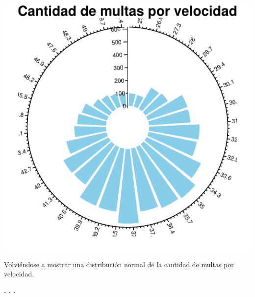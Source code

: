 \documentclass{article}\usepackage[]{graphicx}\usepackage[]{color}
\makeatletter
\def\maxwidth{ %
  \ifdim\Gin@nat@width>\linewidth
    \linewidth
  \else
    \Gin@nat@width
  \fi
}
\newenvironment{knitrout}{}{} %
\makeatother
\begin{document}
\begin{knitrout}
\color{fgcolor}

{\centering \includegraphics[width=\maxwidth]{figure/circlize_colum-1} 

}



\end{knitrout}
Volvi\'endose a mostrar una distribuci\'on normal de la cantidad de multas por velocidad.
\begin{center}
\textbf{. . .}
\end{center}
\end{document}
